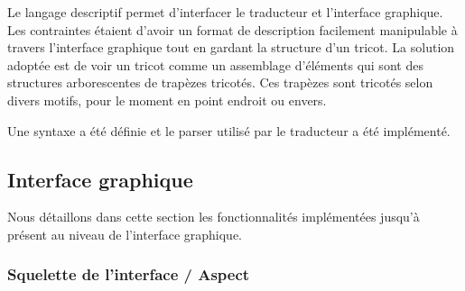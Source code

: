 \documentclass{article}
\begin{document}
Le langage descriptif permet d'interfacer le traducteur et l'interface graphique. Les contraintes étaient d'avoir un format de description facilement manipulable à travers l'interface graphique tout en gardant la structure d'un tricot. La solution adoptée est de voir un tricot comme un assemblage d'éléments qui sont des structures arborescentes de trapèzes tricotés. Ces trapèzes sont tricotés selon divers motifs, pour le moment en point endroit ou envers.


Une syntaxe a été définie et le parser utilisé par le traducteur a été implémenté.


\subsection{Interface graphique}

Nous détaillons dans cette section les fonctionnalités implémentées jusqu'à présent au niveau de l'interface graphique.

\subsubsection{Squelette de l'interface / Aspect}
\end{document}

